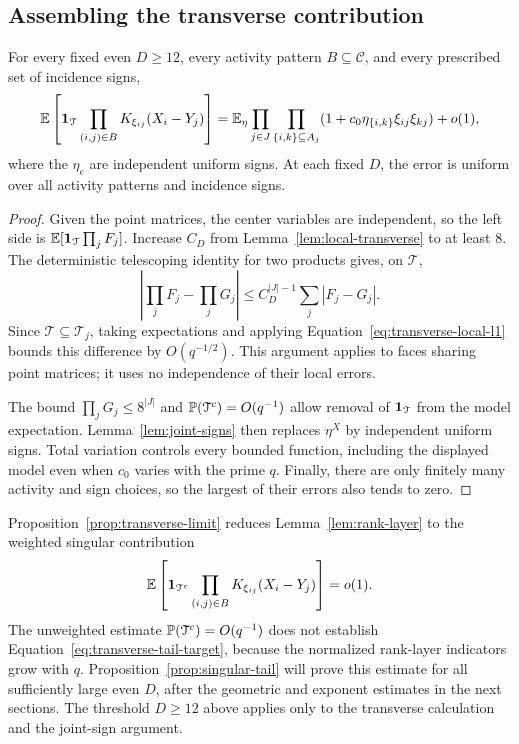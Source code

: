 \subsection{Assembling the transverse contribution}

\begin{proposition}
\label{prop:transverse-limit}
For every fixed even $D\geq12$, every activity pattern
$B\subseteq\mathscr C$, and every prescribed set of incidence signs,
\begin{equation}
\label{eq:transverse-limit}
 \E\left[\1_{\mathcal T}
       \prod_{(i,j)\in B}K_{\xi_{ij}}(X_i-Y_j)\right]
 =\E_\eta\prod_{j\in J}\prod_{\{i,k\}\subseteq A_j}
       (1+c_0\eta_{\{i,k\}}\xi_{ij}\xi_{kj})+o(1),
\end{equation}
where the $\eta_e$ are independent uniform signs. At each fixed $D$,
the error is uniform over all activity patterns and incidence signs.
\end{proposition}

\begin{proof}
Given the point matrices, the center variables are independent, so the
left side is $\E[\1_{\mathcal T}\prod_jF_j]$. Increase $C_D$ from
Lemma~\ref{lem:local-transverse} to at least $8$. The deterministic
telescoping identity for two products gives, on $\mathcal T$,
\[
 \left|\prod_jF_j-\prod_jG_j\right|
 \leq C_D^{|J|-1}\sum_j|F_j-G_j|.
\]
Since $\mathcal T\subseteq\mathcal T_j$, taking expectations and
applying Equation~\eqref{eq:transverse-local-l1} bounds this difference
by $O(q^{-1/2})$. This argument applies to faces sharing point matrices;
it uses no independence of their local errors.

The bound $\prod_jG_j\leq8^{|J|}$ and
$\P(\mathcal T^c)=O(q^{-1})$ allow removal of
$\1_{\mathcal T}$ from the model expectation. Lemma~\ref{lem:joint-signs}
then replaces $\eta^X$ by independent uniform signs. Total variation
controls every bounded function, including the displayed model even
when $c_0$ varies with the prime $q$. Finally, there are only finitely
many activity and sign choices, so the largest of their errors also
tends to zero.
\end{proof}

Proposition~\ref{prop:transverse-limit} reduces
Lemma~\ref{lem:rank-layer} to the weighted singular contribution
\begin{equation}
\label{eq:transverse-tail-target}
 \E\left[\1_{\mathcal T^c}
       \prod_{(i,j)\in B}K_{\xi_{ij}}(X_i-Y_j)\right]=o(1).
\end{equation}
The unweighted estimate $\P(\mathcal T^c)=O(q^{-1})$ does not establish
Equation~\eqref{eq:transverse-tail-target}, because the normalized
rank-layer indicators grow with $q$. Proposition~\ref{prop:singular-tail}
will prove this estimate for all sufficiently large even $D$, after
the geometric and exponent estimates in the next sections. The
threshold $D\geq12$ above applies only to the transverse calculation
and the joint-sign argument.
